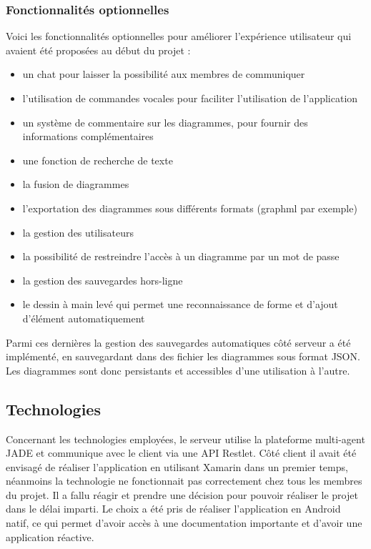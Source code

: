 \subsubsection{Fonctionnalités optionnelles}
Voici les fonctionnalités optionnelles pour améliorer l'expérience utilisateur qui avaient été proposées au début du projet :
\begin{itemize}
\item un chat pour laisser la possibilité aux membres de communiquer
\item l'utilisation de commandes vocales pour faciliter l'utilisation de l'application
\item un système de commentaire sur les diagrammes, pour fournir des informations complémentaires
\item une fonction de recherche de texte
\item la fusion de diagrammes
\item l'exportation des diagrammes sous différents formats (graphml par exemple)
\item la gestion des utilisateurs
\item la possibilité de restreindre l'accès à un diagramme par un mot de passe
\item la gestion des sauvegardes hors-ligne
\item le dessin à main levé qui permet une reconnaissance de forme et d'ajout d'élément automatiquement
\end{itemize}

Parmi ces dernières la gestion des sauvegardes automatiques côté serveur a été implémenté, en sauvegardant dans des fichier les diagrammes sous format JSON. Les diagrammes sont donc persistants et accessibles d'une utilisation à l'autre.

\subsection{Technologies}
Concernant les technologies employées, le serveur utilise la plateforme multi-agent JADE et communique avec le client via une API Restlet.
Côté client il avait été envisagé de réaliser l'application en utilisant Xamarin dans un premier temps, néanmoins la technologie ne fonctionnait pas correctement chez tous les membres du projet. Il a fallu réagir et prendre une décision pour pouvoir réaliser le projet dans le délai imparti. Le choix a été pris de réaliser l'application en Android natif, ce qui permet d'avoir accès à une documentation importante et d'avoir une application réactive.

